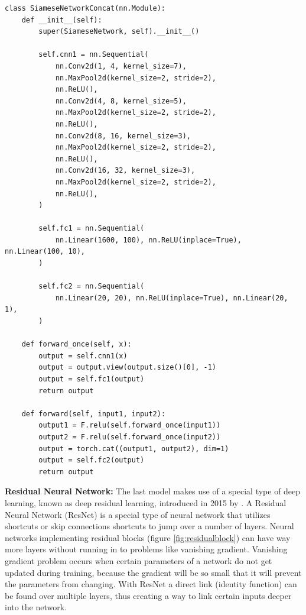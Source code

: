  \begin{lstlisting}[caption={Code for CNN with Cross Entropy Loss}, label={lst:cnncel}, frame=single, breaklines=true]
 class SiameseNetworkConcat(nn.Module):
    def __init__(self):
        super(SiameseNetwork, self).__init__()

        self.cnn1 = nn.Sequential(
            nn.Conv2d(1, 4, kernel_size=7),
            nn.MaxPool2d(kernel_size=2, stride=2),
            nn.ReLU(),
            nn.Conv2d(4, 8, kernel_size=5),
            nn.MaxPool2d(kernel_size=2, stride=2),
            nn.ReLU(),
            nn.Conv2d(8, 16, kernel_size=3),
            nn.MaxPool2d(kernel_size=2, stride=2),
            nn.ReLU(),
            nn.Conv2d(16, 32, kernel_size=3),
            nn.MaxPool2d(kernel_size=2, stride=2),
            nn.ReLU(),
        )

        self.fc1 = nn.Sequential(
            nn.Linear(1600, 100), nn.ReLU(inplace=True), nn.Linear(100, 10),
        )

        self.fc2 = nn.Sequential(
            nn.Linear(20, 20), nn.ReLU(inplace=True), nn.Linear(20, 1),
        )

    def forward_once(self, x):
        output = self.cnn1(x)
        output = output.view(output.size()[0], -1)
        output = self.fc1(output)
        return output

    def forward(self, input1, input2):
        output1 = F.relu(self.forward_once(input1))
        output2 = F.relu(self.forward_once(input2))
        output = torch.cat((output1, output2), dim=1)
        output = self.fc2(output)
        return output
 \end{lstlisting}

\textbf{Residual Neural Network:} The last model makes use of a special type of deep learning, known as deep residual learning, introduced in 2015 by \cite{he2016deep}. A Residual Neural Network (ResNet) is a special type of neural network that utilizes shortcuts or skip connections shortcuts to jump over a number of layers. Neural networks implementing residual blocks (figure \ref{fig:residualblock}) can have way more layers without running in to problems like vanishing gradient. Vanishing gradient problem occurs when certain parameters of a network do not get updated during training, because the gradient will be so small that it will prevent the parameters from changing. With ResNet a direct link (identity function) can be found over multiple layers, thus creating a way to link certain inputs deeper into the network.

